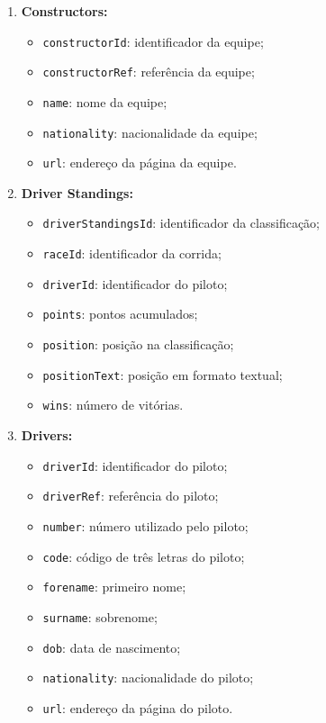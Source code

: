 \documentclass[12pt]{article}
\begin{document}
\begin{enumerate}
    \item \textbf{Constructors:}
    \begin{itemize}
        \item \texttt{constructorId}: identificador da equipe;
        \item \texttt{constructorRef}: referência da equipe;
        \item \texttt{name}: nome da equipe;
        \item \texttt{nationality}: nacionalidade da equipe;
        \item \texttt{url}: endereço da página da equipe.
    \end{itemize}

    \item \textbf{Driver Standings:}
    \begin{itemize}
        \item \texttt{driverStandingsId}: identificador da classificação;
        \item \texttt{raceId}: identificador da corrida;
        \item \texttt{driverId}: identificador do piloto;
        \item \texttt{points}: pontos acumulados;
        \item \texttt{position}: posição na classificação;
        \item \texttt{positionText}: posição em formato textual;
        \item \texttt{wins}: número de vitórias.
    \end{itemize}

    \item \textbf{Drivers:}
    \begin{itemize}
        \item \texttt{driverId}: identificador do piloto;
        \item \texttt{driverRef}: referência do piloto;
        \item \texttt{number}: número utilizado pelo piloto;
        \item \texttt{code}: código de três letras do piloto;
        \item \texttt{forename}: primeiro nome;
        \item \texttt{surname}: sobrenome;
        \item \texttt{dob}: data de nascimento;
        \item \texttt{nationality}: nacionalidade do piloto;
        \item \texttt{url}: endereço da página do piloto.
    \end{itemize}


\end{enumerate}
\end{document}
